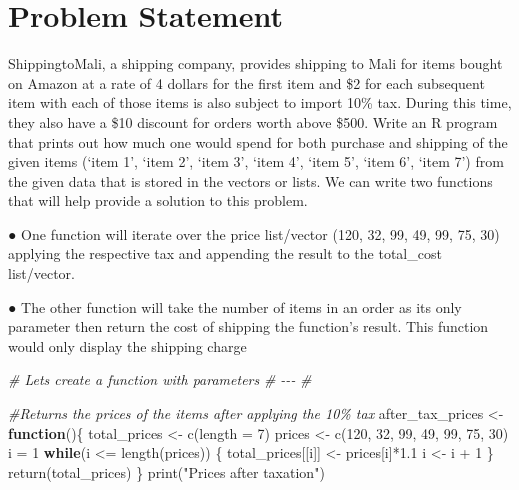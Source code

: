 \documentclass[
]{article}
\author{}
\date{\vspace{-2.5em}}
\newenvironment{Shaded}{\begin{snugshade}}{\end{snugshade}}
\newcommand{\AttributeTok}[1]{\textcolor[rgb]{0.77,0.63,0.00}{#1}}
\newcommand{\CommentTok}[1]{\textcolor[rgb]{0.56,0.35,0.01}{\textit{#1}}}
\newcommand{\ControlFlowTok}[1]{\textcolor[rgb]{0.13,0.29,0.53}{\textbf{#1}}}
\newcommand{\DecValTok}[1]{\textcolor[rgb]{0.00,0.00,0.81}{#1}}
\newcommand{\FloatTok}[1]{\textcolor[rgb]{0.00,0.00,0.81}{#1}}
\newcommand{\FunctionTok}[1]{\textcolor[rgb]{0.00,0.00,0.00}{#1}}
\newcommand{\NormalTok}[1]{#1}
\newcommand{\OtherTok}[1]{\textcolor[rgb]{0.56,0.35,0.01}{#1}}
\newcommand{\SpecialCharTok}[1]{\textcolor[rgb]{0.00,0.00,0.00}{#1}}
\newcommand{\StringTok}[1]{\textcolor[rgb]{0.31,0.60,0.02}{#1}}
\begin{document}
\hypertarget{problem-statement}{%
\section{Problem Statement}\label{problem-statement}}

ShippingtoMali, a shipping company, provides shipping to Mali for items
bought on Amazon at a rate of 4 dollars for the first item and \$2 for
each subsequent item with each of those items is also subject to import
10\% tax. During this time, they also have a \$10 discount for orders
worth above \$500. Write an R program that prints out how much one would
spend for both purchase and shipping of the given items (`item 1', `item
2', `item 3', `item 4', `item 5', `item 6', `item 7') from the given
data that is stored in the vectors or lists. We can write two functions
that will help provide a solution to this problem.

● One function will iterate over the price list/vector (120, 32, 99, 49,
99, 75, 30) applying the respective tax and appending the result to the
total\_cost list/vector.

● The other function will take the number of items in an order as its
only parameter then return the cost of shipping the function's result.
This function would only display the shipping charge

\begin{Shaded}
\begin{Highlighting}[]
\CommentTok{\# Let\textquotesingle{}s create a function with parameters}
\CommentTok{\# {-}{-}{-}}
\CommentTok{\#}

\CommentTok{\#Returns the prices of the items after applying the 10\% tax}
\NormalTok{after\_tax\_prices }\OtherTok{\textless{}{-}} \ControlFlowTok{function}\NormalTok{()\{}
\NormalTok{  total\_prices }\OtherTok{\textless{}{-}} \FunctionTok{c}\NormalTok{(}\AttributeTok{length =} \DecValTok{7}\NormalTok{)}
\NormalTok{  prices }\OtherTok{\textless{}{-}} \FunctionTok{c}\NormalTok{(}\DecValTok{120}\NormalTok{, }\DecValTok{32}\NormalTok{, }\DecValTok{99}\NormalTok{, }\DecValTok{49}\NormalTok{, }\DecValTok{99}\NormalTok{, }\DecValTok{75}\NormalTok{, }\DecValTok{30}\NormalTok{)}
\NormalTok{  i }\OtherTok{=} \DecValTok{1}
  \ControlFlowTok{while}\NormalTok{(i }\SpecialCharTok{\textless{}=} \FunctionTok{length}\NormalTok{(prices)) \{}
\NormalTok{    total\_prices[[i]] }\OtherTok{\textless{}{-}}\NormalTok{ prices[i]}\SpecialCharTok{*}\FloatTok{1.1}
\NormalTok{    i }\OtherTok{\textless{}{-}}\NormalTok{ i }\SpecialCharTok{+} \DecValTok{1}
\NormalTok{  \}}
  \FunctionTok{return}\NormalTok{(total\_prices)}
\NormalTok{\}}
\FunctionTok{print}\NormalTok{(}\StringTok{"Prices after taxation"}\NormalTok{)}
\end{Highlighting}
\end{Shaded}
\end{document}
